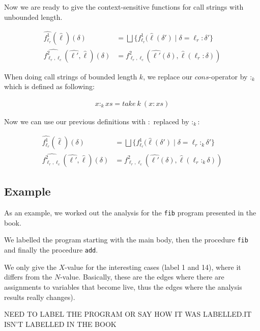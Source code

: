 \documentclass[a4wide,12pt]{article}
\theoremstyle{definition}
\theoremstyle{plain}
\theoremstyle{remark}
\begin{document}
Now we are ready to give the context-sensitive functions for call strings with
unbounded length.

\begin{align}
\widehat{f^1_{\ell_r}} (\widehat{\ell}) (\delta) & = \bigsqcup \{ f^1_{\ell_r} (\widehat{\ell}(\delta') \mid \delta = \ell_r : \delta' \} \\
\widehat{f^2_{\ell_r, \ell_c}} (\widehat{\ell'}, \widehat{\ell}) (\delta) & = f^2_{\ell_r, \ell_c} (\widehat{\ell'}(\delta), \widehat{\ell}(\ell_r : \delta))
\end{align}

When doing call strings of bounded length $k$, we replace our $cons$-operator by
$:_k$ which is defined as following:

\begin{align}
x :_k xs = take\ k\ (x : xs)
\end{align}

Now we can use our previous definitions with $:$ replaced by $:_k$:

\begin{align}
\widehat{f^1_{\ell_r}} (\widehat{\ell}) (\delta) & = \bigsqcup \{ f^1_{\ell_r} (\widehat{\ell}(\delta') \mid \delta = \ell_r :_k \delta' \} \\
\widehat{f^2_{\ell_r, \ell_c}} (\widehat{\ell'}, \widehat{\ell}) (\delta) & = f^2_{\ell_r, \ell_c} (\widehat{\ell'}(\delta), \widehat{\ell}(\ell_r :_k \delta))
\end{align}

\subsection*{Example}

As an example, we worked out the analysis for the \texttt{fib} program presented in the book.

We labelled the program starting with the main body, then
the procedure \texttt{fib} and finally the procedure \texttt{add}.

We only give the $X$-value for the interesting cases (label 1 and 14), where it differs
from the $N$-value. Basically, these are the edges where there are assignments to variables
that become live, thus the edges where the analysis results really changes).

NEED TO LABEL THE PROGRAM OR SAY HOW IT WAS LABELLED.IT ISN'T LABELLED IN THE BOOK
\end{document}

